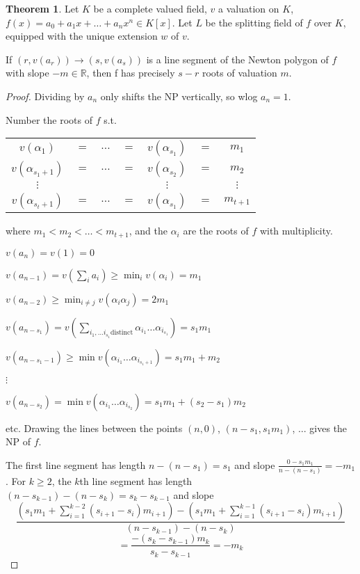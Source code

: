 \documentclass[a4paper]{article}
\theoremstyle{definition}
\theoremstyle{default}
\newtheorem{theorem}[definition]{Theorem}
\theoremstyle{remark}
\begin{document}
\begin{theorem}
	Let $K$ be a complete valued field,
	$v$ a valuation on $K$,
	$f(x)=a_0 + a_1 x + \dots + a_n x^n \in K[x]$.
	Let $L$ be the splitting field of $f$ over $K$,
	equipped with the unique extension $w$ of $v$.
	
	If $(r, v(a_r)) \to (s, v(a_s))$ is a line segment of the Newton polygon of $f$ with slope $-m \in \mathbb{R}$,
	then f has precisely $s-r$ roots of valuation $m$.
\end{theorem}
\begin{proof}
	Dividing by $a_n$ only shifts the NP vertically,
	so wlog $a_n=1$.
	
	Number the roots of $f$ s.t.
	\begin{center}
	\begin{tabular}{ccccccc}
		$v(\alpha_1)$ & $=$ & $\dots$ & $=$ & $v(\alpha_{s_1})$ & $=$ & $m_1$ \\
		$v(\alpha_{s_1+1})$ & $=$ & $\dots$ & $=$ & $v(\alpha_{s_2})$ & $=$ & $m_2$ \\
		$\vdots$ &  &  & & $\vdots$ & & $\vdots$ \\
		$v(\alpha_{s_t+1})$ & $=$ & $\dots$ & $=$ & $v(\alpha_{s_1})$ & $=$ & $m_{t+1}$ \\
	\end{tabular}
	\end{center}
	where $m_1 < m_2 < \dots < m_{t+1}$, and the $\alpha_i$ are the roots of $f$ with multiplicity.
	
	$v(a_n)=v(1)=0$
	
	$v(a_{n-1}) = v(\sum_i a_i) \geq \min_i v(\alpha_i) = m_1$
	
	$v(a_{n-2}) \geq \min_{i \neq j} v(\alpha_i \alpha_j) = 2m_1$
	
	$v(a_{n-s_1}) = v(\sum_{i_1, \dots i_{s_1} \text{distinct}} \alpha_{i_1}\dots\alpha_{i_{s_1}}) = s_1 m_1$
	
	$v(a_{n-s_1-1}) \geq \min v(\alpha_{i_1}\dots\alpha_{i_{s_1+1}}) = s_1m_1+m_2$
	
	$\vdots$
	
	$v(a_{n-s_2}) =\min v(\alpha_{i_1}\dots\alpha_{i_{s_2}}) = s_1m_1 + (s_2-s_1)m_2$
	
	etc. Drawing the lines between the points $(n, 0)$, $(n-s_1, s_1m_1)$, $\dots$ gives the NP of $f$.
	
	The first line segment has length $n-(n-s_1)=s_1$ and slope $\frac{0-s_1m_1}{n-(n-s_1)} = -m_1$. For $k\geq 2$, the $k$th line segment has length $(n-s_{k-1})-(n-s_k)=s_k-s_{k-1}$ and slope
	$$\frac{(s_1m_1+\sum_{i=1}^{k-2}(s_{i+1}-s_i)m_{i+1}) - (s_1m_1+\sum_{i=1}^{k-1}(s_{i+1}-s_i)m_{i+1})}{(n-s_{k-1})-(n-s_k)}$$
	$$= \frac{-(s_k-s_{k-1})m_k}{s_k - s_{k-1}} = -m_k$$

\end{proof}
\end{document}
